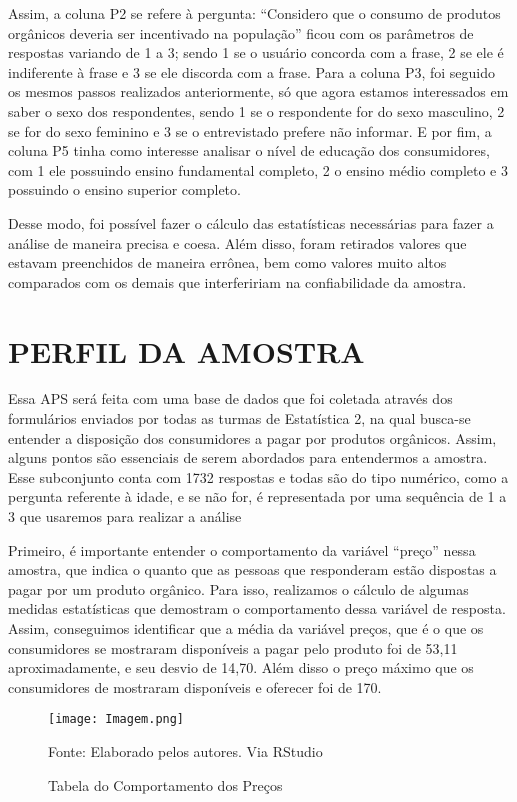 \documentclass[a4paper,12pt]{article}[abntex2]
\begin{document}
Assim, a coluna P2 se refere à pergunta: “Considero que o consumo de produtos orgânicos deveria ser incentivado na população” ficou com os parâmetros de respostas variando de 1 a 3; sendo 1 se o usuário concorda com a frase, 2 se ele é indiferente à frase e 3 se ele discorda com a frase. Para a coluna P3, foi seguido os mesmos passos realizados anteriormente, só que agora estamos interessados em saber o sexo dos respondentes, sendo 1 se o respondente for do sexo masculino, 2 se for do sexo feminino e 3 se o entrevistado prefere não informar. E por fim, a coluna P5 tinha como interesse analisar o nível de educação dos consumidores, com 1 ele possuindo ensino fundamental completo, 2 o ensino médio completo e 3 possuindo o ensino superior completo.  

Desse modo, foi possível fazer o cálculo das estatísticas necessárias para fazer a análise de maneira precisa e coesa. Além disso, foram retirados valores que estavam preenchidos de maneira errônea, bem como valores muito altos comparados com os demais que interfeririam na confiabilidade da amostra. 

\section{\textbf{PERFIL DA AMOSTRA}}
Essa APS será feita com uma base de dados que foi coletada através dos formulários enviados por todas as turmas de Estatística 2, na qual busca-se entender a disposição dos consumidores a pagar por produtos orgânicos. Assim, alguns pontos são essenciais de serem abordados para entendermos a amostra. Esse subconjunto conta com 1732 respostas e todas são do tipo numérico, como a pergunta referente à idade, e se não for, é representada por uma sequência de 1 a 3 que usaremos para realizar a análise 

Primeiro, é importante entender o comportamento da variável “preço” nessa amostra, que indica o quanto que as pessoas que responderam estão dispostas a pagar por um produto orgânico. Para isso, realizamos o cálculo de algumas medidas estatísticas que demostram o comportamento dessa variável de resposta. Assim, conseguimos identificar que a média da variável preços, que é o que os consumidores se mostraram disponíveis a pagar pelo produto foi de 53,11 aproximadamente, e seu desvio de 14,70. Além disso o preço máximo que os consumidores de mostraram disponíveis e oferecer foi de 170.

\begin{figure}[H]
\centering
\caption{Tabela do Comportamento dos Preços}
\texttt{[image: Imagem.png]}
\label{fig:my_label}

\footnotesize{Fonte: Elaborado pelos autores. Via RStudio}
\end{figure}
\end{document}
